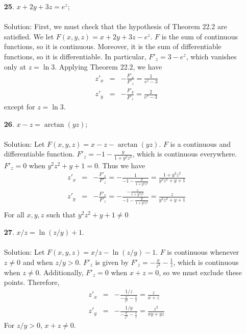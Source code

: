 \documentclass[12pt]{amsbook}
\begin{document}
\begin{enumerate}
\item[{\small\bf 25}.] $x+2y+3z=e^z$;
\\
\\
{\sc Solution}: First, we must check that the hypothesis of Theorem 22.2 are satisfied. We let $F(x,y,z)=x+2y+3z-e^z$. $F$ is the sum of continuous functions, so it is continuous. Moreover, it is the sum of differentiable functions, so it is differentiable. In particular, $F'_z=3-e^z$, which vanishes only at $z=\ln 3$. Applying Theorem 22.2, we have
\begin{eqnarray*}
z'_x&=& -\frac{F'_x}{F'_z}=\frac{1}{e^z-3}\\
z'_y&=& -\frac{F'_y}{F'_z}=\frac{2}{e^z-3}
\end{eqnarray*}
except for $z= \ln3$.
\\
\item[{\small\bf 26}.] $x-z=\arctan(yz)$;
\\
\\
{\sc Solution}: Let $F(x,y,z)=x-z-\arctan(yz)$. $F$ is a continuous and differentiable function. $F'_z=-1-\frac{y}{1+y^2z^2}$, which is continuous everywhere. $F'_z=0$ when $y^2z^2+y+1=0$. Thus we have
\begin{eqnarray*}
z'_x&=& -\frac{F'_x}{F'_z}=-\frac{1}{-1-\frac{y}{1+y^2z^2}}=\frac{1+y^2z^2}{y^2z^2+y+1}\\
z'_y&=& -\frac{F'_x}{F'_z}=-\frac{-\frac{z}{1+y^2z^2}}{-1-\frac{y}{1+y^2z^2}}=\frac{z}{y^2z^2+y+1}\\
\end{eqnarray*}
For all $x,y,z$ such that $y^2z^2+y+1 \neq 0$
\\
\item[{\small\bf 27}.] $x/z=\ln(z/y)+1$.
\\
\\
{\sc Solution}: Let $F(x,y,z)=x/z-\ln(z/y)-1$. $F$ is continuous whenever $z \neq 0$ and when $z/y>0$. $F'_z$ is given by $F'_z=-\frac{x}{z^2}-\frac{1}{z}$, which is continuous when $z \neq 0$. Additionally, $F'_z=0$ when $x+z=0$, so we must exclude these points. Therefore,
\begin{eqnarray*}
z'_x&=&-\frac{1/z}{-\frac{x}{z^2}-\frac{1}{z}}=\frac{z}{x+z} \\
z'_y&=&-\frac{1/y}{-\frac{x}{z^2}-\frac{1}{z}}=\frac{z^2}{xy+yz}
\end{eqnarray*}
For $z/y>0$, $x+z \neq 0$. 
\end{enumerate}
\end{document}
